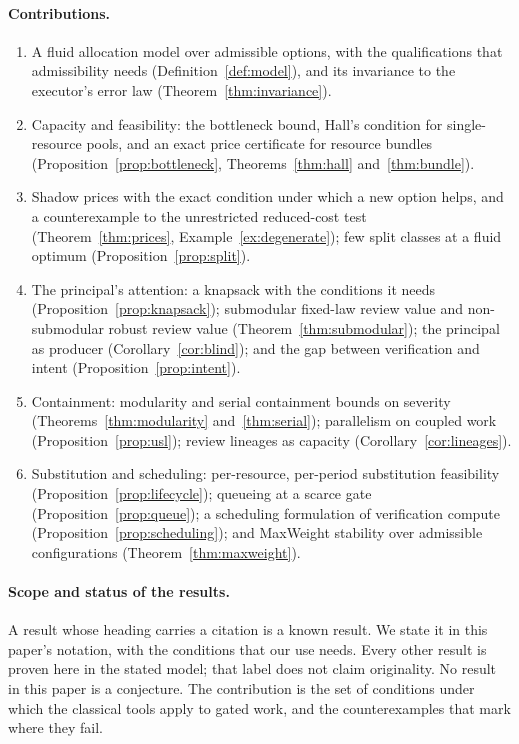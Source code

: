 \documentclass[11pt]{article}
\theoremstyle{definition}
\theoremstyle{remark}
\begin{document}
\paragraph{Contributions.}
\begin{enumerate}[leftmargin=*,itemsep=2pt]
\item A fluid allocation model over admissible options, with the qualifications that admissibility
needs (Definition~\ref{def:model}), and its invariance to the executor's error law
(Theorem~\ref{thm:invariance}).
\item Capacity and feasibility: the bottleneck bound, Hall's condition for single-resource pools, and
an exact price certificate for resource bundles (Proposition~\ref{prop:bottleneck},
Theorems~\ref{thm:hall} and~\ref{thm:bundle}).
\item Shadow prices with the exact condition under which a new option helps, and a counterexample to
the unrestricted reduced-cost test (Theorem~\ref{thm:prices}, Example~\ref{ex:degenerate}); few split
classes at a fluid optimum (Proposition~\ref{prop:split}).
\item The principal's attention: a knapsack with the conditions it needs
(Proposition~\ref{prop:knapsack}); submodular fixed-law review value and non-submodular robust review
value (Theorem~\ref{thm:submodular}); the principal as producer (Corollary~\ref{cor:blind}); and the
gap between verification and intent (Proposition~\ref{prop:intent}).
\item Containment: modularity and serial containment bounds on severity
(Theorems~\ref{thm:modularity} and~\ref{thm:serial}); parallelism on coupled work
(Proposition~\ref{prop:usl}); review lineages as capacity (Corollary~\ref{cor:lineages}).
\item Substitution and scheduling: per-resource, per-period substitution feasibility
(Proposition~\ref{prop:lifecycle}); queueing at a scarce gate (Proposition~\ref{prop:queue}); a
scheduling formulation of verification compute (Proposition~\ref{prop:scheduling}); and MaxWeight
stability over admissible configurations (Theorem~\ref{thm:maxweight}).
\end{enumerate}

\paragraph{Scope and status of the results.}
A result whose heading carries a citation is a known result. We state it in this paper's notation,
with the conditions that our use needs. Every other result is proven here in the stated model; that
label does not claim originality. No result in this paper is a conjecture. The contribution is the
set of conditions under which the classical tools apply to gated work, and the counterexamples that
mark where they fail.
\end{document}
